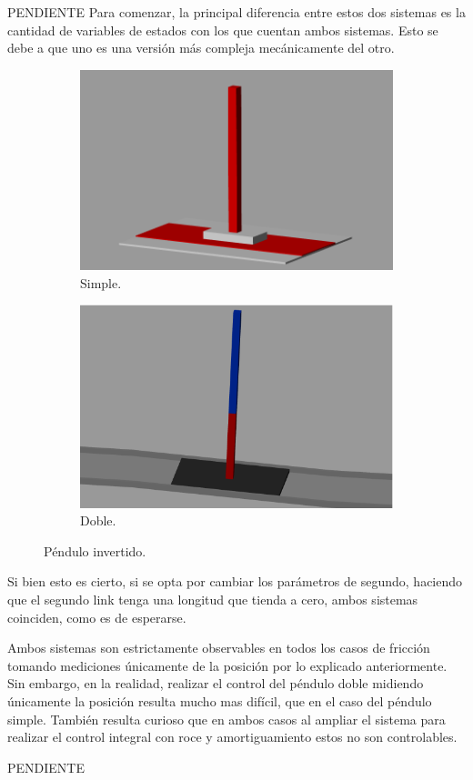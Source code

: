 PENDIENTE
Para comenzar, la principal diferencia entre estos dos sistemas es la cantidad de variables de estados con los que cuentan ambos sistemas.
Esto se debe a que uno es una versión más compleja mecánicamente del otro.
\begin{figure}[H]
\begin{subfigure}{.5\textwidth}
  \centering
  \includegraphics[width=0.95\linewidth]{../Analisis de Resultados/ImagenesAnalisis de Resultados/equilibrio.png}
  \caption{Simple.}
  \label{fig:sfig1}
\end{subfigure}%
\begin{subfigure}{.5\textwidth}
  \centering
  \includegraphics[width=0.95\linewidth]{../Analisis de Resultados/ImagenesAnalisis de Resultados/simscape_double_pendulum.png}
  \caption{Doble.}
  \label{fig:sfig2}
\end{subfigure}
\caption{Péndulo invertido.}
\label{fig:fig}
\end{figure}
Si bien esto es cierto, si se opta por cambiar los parámetros de segundo, haciendo que el segundo link tenga una longitud que tienda a cero, ambos sistemas coinciden, como es de esperarse.

Ambos sistemas son estrictamente observables en todos los casos de fricción tomando mediciones únicamente de la posición por lo explicado anteriormente. Sin embargo, en la realidad, realizar el control del péndulo doble midiendo únicamente la posición resulta mucho mas difícil, que en el caso del péndulo simple.
También resulta curioso que en ambos casos al ampliar el sistema para realizar el control integral con roce y amortiguamiento estos no son controlables.

PENDIENTE
%
